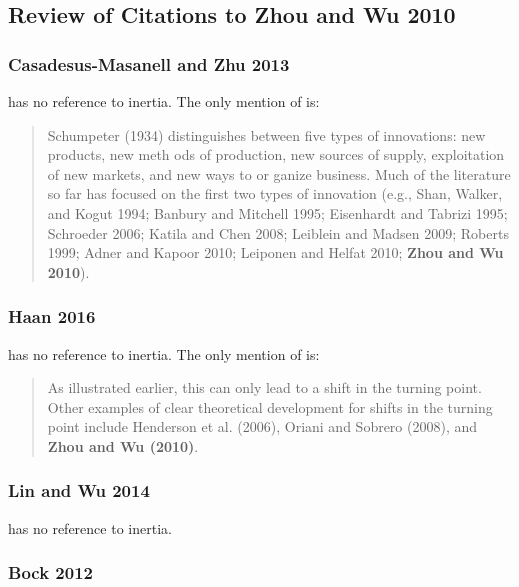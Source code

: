 \subsection{Review of Citations to Zhou and Wu 2010}

\subsubsection{Casadesus-Masanell and Zhu 2013}

\cite{casadesus2013business} has no reference to inertia. The only mention of \cite{zhou2010technological} is: \\
\begin{quotation}
	Schumpeter (1934) distinguishes between five types of innovations: new products, new meth
	ods of production, new sources of supply, exploitation of new markets, and new ways to or
	ganize business. Much of the literature so far has focused on the first two types of innovation
	(e.g., Shan, Walker, and Kogut 1994; Banbury and Mitchell 1995; Eisenhardt and Tabrizi
	1995; Schroeder 2006; Katila and Chen 2008; Leiblein and Madsen 2009; Roberts 1999; Adner
	and Kapoor 2010; Leiponen and Helfat 2010; \textbf{Zhou and Wu 2010}). \textellipsis
\end{quotation}

\subsubsection{Haan 2016}

\cite{haans2016thinking} has no reference to inertia. The only mention of \cite{zhou2010technological} is: \\
\begin{quotation}
	\textellipsis As illustrated earlier, this can only lead to a shift in the
	turning point. Other examples of clear theoretical development for shifts in the turning point
	include Henderson et al. (2006), Oriani and Sobrero (2008), and \textbf{Zhou and Wu (2010)}.
\end{quotation}

\subsubsection{Lin and Wu 2014}

\cite{lin2014exploring} has no reference to inertia. \\

\subsubsection{Bock 2012}

